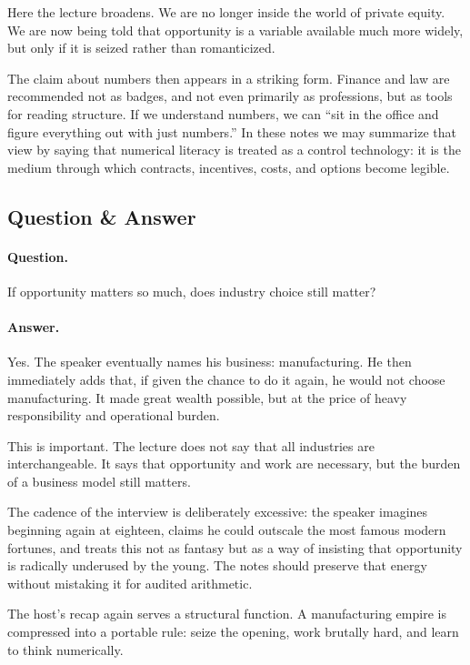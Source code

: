 Here the lecture broadens. We are no longer inside the world of private equity. We are now being told that opportunity is a variable available much more widely, but only if it is seized rather than romanticized.

The claim about numbers then appears in a striking form. Finance and law are recommended not as badges, and not even primarily as professions, but as tools for reading structure. If we understand numbers, we can ``sit in the office and figure everything out with just numbers.'' In these notes we may summarize that view by saying that numerical literacy is treated as a control technology: it is the medium through which contracts, incentives, costs, and options become legible.

\subsection{Question \& Answer}

\paragraph{Question.} If opportunity matters so much, does industry choice still matter?

\paragraph{Answer.} Yes. The speaker eventually names his business: manufacturing. He then immediately adds that, if given the chance to do it again, he would not choose manufacturing. It made great wealth possible, but at the price of heavy responsibility and operational burden.

This is important. The lecture does not say that all industries are interchangeable. It says that opportunity and work are necessary, but the burden of a business model still matters.

The cadence of the interview is deliberately excessive: the speaker imagines beginning again at eighteen, claims he could outscale the most famous modern fortunes, and treats this not as fantasy but as a way of insisting that opportunity is radically underused by the young. The notes should preserve that energy without mistaking it for audited arithmetic.

The host's recap again serves a structural function. A manufacturing empire is compressed into a portable rule: seize the opening, work brutally hard, and learn to think numerically.

